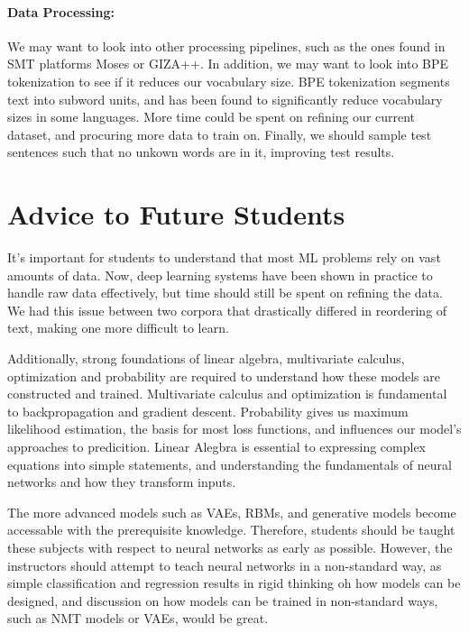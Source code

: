 \documentclass[twoside,twocolumn]{article}
\begin{document}
\paragraph{Data Processing:} We may want to look into other processing pipelines,
such as the ones found in SMT platforms Moses or GIZA++. In addition,
we may want to look into BPE tokenization to see if it reduces our vocabulary
size. BPE tokenization segments text into subword units, and has been found
to significantly reduce vocabulary sizes in some languages. More time could be
spent on refining our current dataset, and procuring more data to train on.
Finally, we should sample test sentences such that no unkown words are in it,
improving test results.
\section{Advice to Future Students}
\label{sec:advice}
It's important for students to understand that most ML problems
rely on vast amounts of data. Now, deep learning systems have been shown in
practice to handle raw data effectively, but time should still be spent
on refining the data. We had this issue between two corpora that drastically
differed in reordering of text, making one more difficult to learn.

Additionally, strong foundations of linear algebra, multivariate calculus,
optimization and probability are required to understand how these models
are constructed and trained. Multivariate calculus and optimization is
fundamental to backpropagation and gradient descent.
Probability gives us maximum likelihood estimation, the basis for
most loss functions, and influences our model's approaches to
predicition. Linear Alegbra is essential to expressing complex equations into
simple statements, and understanding the fundamentals of neural networks
and how they transform inputs.

The more advanced models such as VAEs, RBMs, and
generative models become accessable with the prerequisite knowledge.
Therefore, students should be taught
these subjects with respect to neural networks as early as possible. However,
the instructors should attempt to teach neural networks in a non-standard way,
as simple classification and regression results in rigid thinking oh how
models can be designed, and discussion on how models can be trained in
non-standard ways, such as NMT models or VAEs, would be great.
\end{document}

